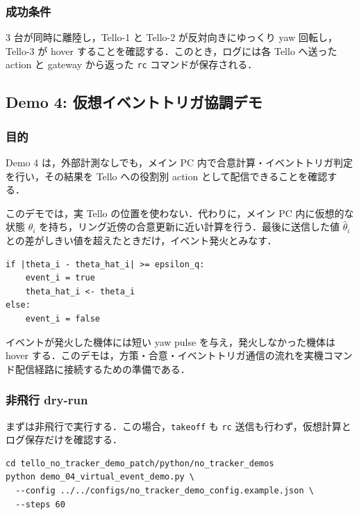 \subsubsection{成功条件}

3 台が同時に離陸し，Tello-1 と Tello-2 が反対向きにゆっくり yaw 回転し，Tello-3 が hover することを確認する．このとき，ログには各 Tello へ送った action と gateway から返った \texttt{rc} コマンドが保存される．

\subsection{Demo 4: 仮想イベントトリガ協調デモ}

\subsubsection{目的}

Demo 4 は，外部計測なしでも，メイン PC 内で合意計算・イベントトリガ判定を行い，その結果を Tello への役割別 action として配信できることを確認する．

このデモでは，実 Tello の位置を使わない．代わりに，メイン PC 内に仮想的な状態 \(\theta_i\) を持ち，リング近傍の合意更新に近い計算を行う．最後に送信した値 \(\hat{\theta}_i\) との差がしきい値を超えたときだけ，イベント発火とみなす．

\begin{lstlisting}
if |theta_i - theta_hat_i| >= epsilon_q:
    event_i = true
    theta_hat_i <- theta_i
else:
    event_i = false
\end{lstlisting}

イベントが発火した機体には短い yaw pulse を与え，発火しなかった機体は hover する．このデモは，方策・合意・イベントトリガ通信の流れを実機コマンド配信経路に接続するための準備である．

\subsubsection{非飛行 dry-run}

まずは非飛行で実行する．この場合，\texttt{takeoff} も \texttt{rc} 送信も行わず，仮想計算とログ保存だけを確認する．

\begin{lstlisting}
cd tello_no_tracker_demo_patch/python/no_tracker_demos
python demo_04_virtual_event_demo.py \
  --config ../../configs/no_tracker_demo_config.example.json \
  --steps 60
\end{lstlisting}

